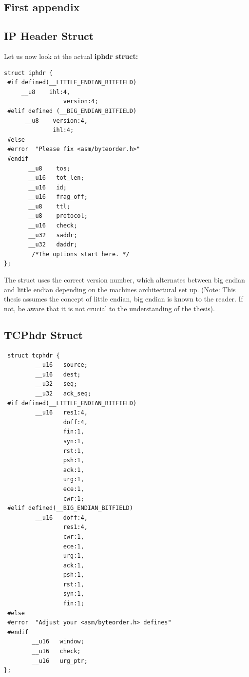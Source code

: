   \begin{appendices}

\chapter{First appendix}
  \section{IP Header Struct}
  Let us now look at the actual \textbf{iphdr struct:} \\
  
\begin{lstlisting}
struct iphdr {
 #if defined(__LITTLE_ENDIAN_BITFIELD)
     __u8    ihl:4,
                 version:4;
 #elif defined (__BIG_ENDIAN_BITFIELD)
      __u8    version:4,
              ihl:4;
 #else
 #error  "Please fix <asm/byteorder.h>"
 #endif
       __u8    tos;
       __u16   tot_len;
       __u16   id;
       __u16   frag_off;
       __u8    ttl;
       __u8    protocol;
       __u16   check;
       __u32   saddr;
       __u32   daddr;
        /*The options start here. */
};
\end{lstlisting} 

The struct uses the correct version number, which alternates between big endian and little endian depending on the machines architectural set up. (Note: This thesis assumes the concept  of little endian, big endian is known to the reader. If not, be aware that it is not crucial to the understanding of the thesis). 


  \section{TCPhdr Struct}

\begin{lstlisting}
 struct tcphdr {
         __u16   source;
         __u16   dest;
         __u32   seq;
         __u32   ack_seq;
 #if defined(__LITTLE_ENDIAN_BITFIELD)
         __u16   res1:4,
                 doff:4,
                 fin:1,
                 syn:1,
                 rst:1,
                 psh:1,
                 ack:1,
                 urg:1,
                 ece:1,
                 cwr:1;
 #elif defined(__BIG_ENDIAN_BITFIELD)
         __u16   doff:4,
                 res1:4,
                 cwr:1,
                 ece:1,
                 urg:1,
                 ack:1,
                 psh:1,
                 rst:1,
                 syn:1,
                 fin:1;
 #else
 #error  "Adjust your <asm/byteorder.h> defines"
 #endif  
        __u16   window;
        __u16   check;
        __u16   urg_ptr;
};
\end{lstlisting}



\end{appendices}
